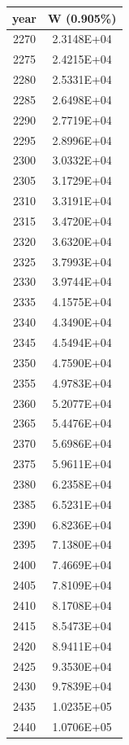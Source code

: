 \documentclass[a4paper]{article}
\begin{document}
	\begin{tabular}{|c|c|}
		\hline
		year & W (0.905\%) \\
		\hline
		2270 & 2.3148E+04 \\
		\hline
		2275 & 2.4215E+04 \\
		\hline
		2280 & 2.5331E+04 \\
		\hline
		2285 & 2.6498E+04 \\
		\hline
		2290 & 2.7719E+04 \\
		\hline
		2295 & 2.8996E+04 \\
		\hline
		2300 & 3.0332E+04 \\
		\hline
		2305 & 3.1729E+04 \\
		\hline
		2310 & 3.3191E+04 \\
		\hline
		2315 & 3.4720E+04 \\
		\hline
		2320 & 3.6320E+04 \\
		\hline
		2325 & 3.7993E+04 \\
		\hline
		2330 & 3.9744E+04 \\
		\hline
		2335 & 4.1575E+04 \\
		\hline
		2340 & 4.3490E+04 \\
		\hline
		2345 & 4.5494E+04 \\
		\hline
		2350 & 4.7590E+04 \\
		\hline
		2355 & 4.9783E+04 \\
		\hline
		2360 & 5.2077E+04 \\
		\hline
		2365 & 5.4476E+04 \\
		\hline
		2370 & 5.6986E+04 \\
		\hline
		2375 & 5.9611E+04 \\
		\hline
		2380 & 6.2358E+04 \\
		\hline
		2385 & 6.5231E+04 \\
		\hline
		2390 & 6.8236E+04 \\
		\hline
		2395 & 7.1380E+04 \\
		\hline
		2400 & 7.4669E+04 \\
		\hline
		2405 & 7.8109E+04 \\
		\hline
		2410 & 8.1708E+04 \\
		\hline
		2415 & 8.5473E+04 \\
		\hline
		2420 & 8.9411E+04 \\
		\hline
		2425 & 9.3530E+04 \\
		\hline
		2430 & 9.7839E+04 \\
		\hline
		2435 & 1.0235E+05 \\
		\hline
		2440 & 1.0706E+05 \\

\end{tabular}
\end{document}
